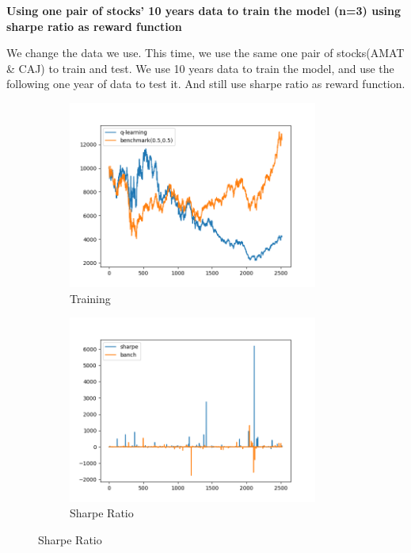 \newpage
\textbf{Using one pair of stocks’ 10 years data to train the model (n=3) using sharpe ratio as reward function}

We change the data we use. This time, we use the same one pair of stocks(AMAT \& CAJ) to train and test. We use 10 years data to train the model, and use the following one year of data to test it. And still use sharpe ratio as reward function.

\begin{figure}[H]
\begin{subfigure}{.5\textwidth}%
\centering
\includegraphics[clip, width=0.9\textwidth]{Graphics/NEW_TRY1.png} \caption{Training} 
\end{subfigure}%
\begin{subfigure}{.5\textwidth}%
\centering
\includegraphics[clip, width=0.9\textwidth]{Graphics/NEW_TRY1S.png} \caption{Sharpe Ratio}

\end{subfigure}
\end{figure}
